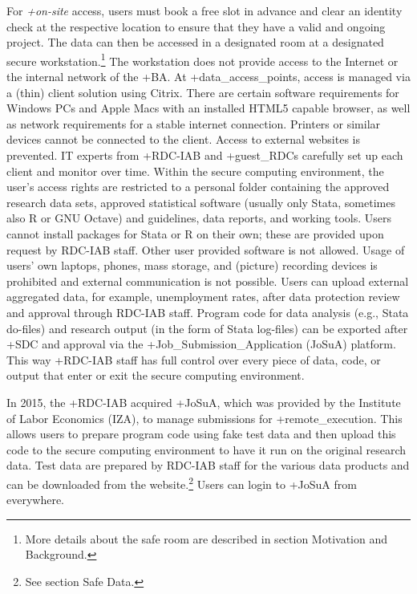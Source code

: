 \documentclass[
]{book}
\begin{document}
For \emph{+on-site\textbar{}} access, users must book a free slot in advance and clear an identity check at the respective location to ensure that they have a valid and ongoing project. The data can then be accessed in a designated room at a designated secure workstation.\footnote{More details about the safe room are described in section Motivation and Background.} The workstation does not provide access to the Internet or the internal network of the +BA\textbar. At +data\_access\_points\textbar, access is managed via a (thin) client solution using Citrix. There are certain software requirements for Windows PCs and Apple Macs with an installed HTML5 capable browser, as well as network requirements for a stable internet connection. Printers or similar devices cannot be connected to the client. Access to external websites is prevented. IT experts from +RDC-IAB\textbar{} and +guest\_RDC\textbar s carefully set up each client and monitor over time. Within the secure computing environment, the user's access rights are restricted to a personal folder containing the approved research data sets, approved statistical software (usually only Stata, sometimes also R or GNU Octave) and guidelines, data reports, and working tools. Users cannot install packages for Stata or R on their own; these are provided upon request by RDC-IAB staff. Other user provided software is not allowed. Usage of users' own laptops, phones, mass storage, and (picture) recording devices is prohibited and external communication is not possible. Users can upload external aggregated data, for example, unemployment rates, after data protection review and approval through RDC-IAB staff. Program code for data analysis (e.g., Stata do-files) and research output (in the form of Stata log-files) can be exported after +SDC\textbar{} and approval via the +Job\_Submission\_Application\textbar{} (JoSuA) platform. This way +RDC-IAB\textbar{} staff has full control over every piece of data, code, or output that enter or exit the secure computing environment.

In 2015, the +RDC-IAB\textbar{} acquired +JoSuA\textbar, which was provided by the Institute of Labor Economics (IZA), to manage submissions for +remote\_execution\textbar. This allows users to prepare program code using fake test data and then upload this code to the secure computing environment to have it run on the original research data. Test data are prepared by RDC-IAB staff for the various data products and can be downloaded from the website.\footnote{See section Safe Data.} Users can login to +JoSuA\textbar{} from everywhere.
\end{document}
